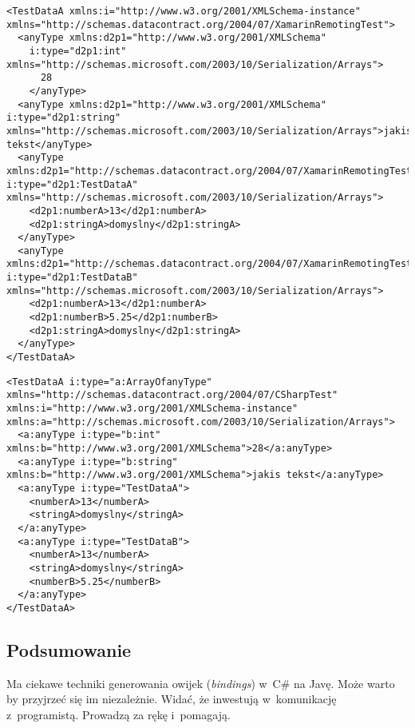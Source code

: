 \begin{description}
\begin{lstlisting}[float, frame=single, caption={Testowa tablica zserializowana przez \texttt{DataContractSerializer} pod Mono. Niektóre linie zostały przycięte, aby zmieścić się na stronie.}, label=code:xamrinArray]
<TestDataA xmlns:i="http://www.w3.org/2001/XMLSchema-instance" xmlns="http://schemas.datacontract.org/2004/07/XamarinRemotingTest">
  <anyType xmlns:d2p1="http://www.w3.org/2001/XMLSchema"
	i:type="d2p1:int" xmlns="http://schemas.microsoft.com/2003/10/Serialization/Arrays">
	  28
	</anyType>
  <anyType xmlns:d2p1="http://www.w3.org/2001/XMLSchema" i:type="d2p1:string" xmlns="http://schemas.microsoft.com/2003/10/Serialization/Arrays">jakis tekst</anyType>
  <anyType xmlns:d2p1="http://schemas.datacontract.org/2004/07/XamarinRemotingTest" i:type="d2p1:TestDataA" xmlns="http://schemas.microsoft.com/2003/10/Serialization/Arrays">
    <d2p1:numberA>13</d2p1:numberA>
    <d2p1:stringA>domyslny</d2p1:stringA>
  </anyType>
  <anyType xmlns:d2p1="http://schemas.datacontract.org/2004/07/XamarinRemotingTest" i:type="d2p1:TestDataB" xmlns="http://schemas.microsoft.com/2003/10/Serialization/Arrays">
    <d2p1:numberA>13</d2p1:numberA>
    <d2p1:numberB>5.25</d2p1:numberB>
    <d2p1:stringA>domyslny</d2p1:stringA>
  </anyType>
</TestDataA>
\end{lstlisting}

\begin{lstlisting}[float, frame=single, caption={Testowa tablica zserializowana przez \texttt{DataContractSerializer} pod .NET 4.5. Niektóre linie zostały przycięte, aby zmieścić się na stronie.}, label=code:dotNetArray]
<TestDataA i:type="a:ArrayOfanyType" xmlns="http://schemas.datacontract.org/2004/07/CSharpTest" xmlns:i="http://www.w3.org/2001/XMLSchema-instance" xmlns:a="http://schemas.microsoft.com/2003/10/Serialization/Arrays">
  <a:anyType i:type="b:int" xmlns:b="http://www.w3.org/2001/XMLSchema">28</a:anyType>
  <a:anyType i:type="b:string" xmlns:b="http://www.w3.org/2001/XMLSchema">jakis tekst</a:anyType>
  <a:anyType i:type="TestDataA">
    <numberA>13</numberA>
    <stringA>domyslny</stringA>
  </a:anyType>
  <a:anyType i:type="TestDataB">
    <numberA>13</numberA>
    <stringA>domyslny</stringA>
    <numberB>5.25</numberB>
  </a:anyType>
</TestDataA>
\end{lstlisting}

\end{description}

\subsection{Podsumowanie}
Ma ciekawe techniki generowania owijek (\emph{bindings}) w~C\# na Javę. Może warto by przyjrzeć się im niezależnie.
Widać, że inwestują w~komunikację z~programistą. Prowadzą za rękę i~pomagają.

